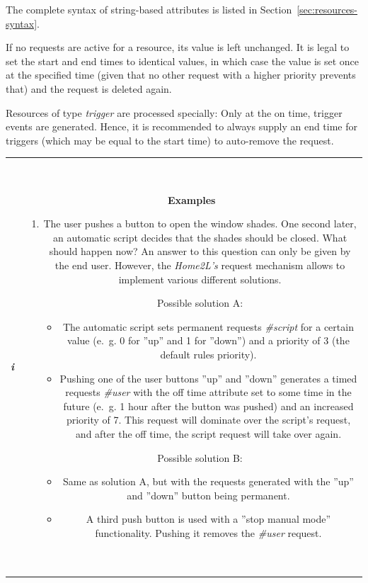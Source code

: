 \documentclass[12pt,english,parskip=half,headheight=19pt]{scrreprt}
\newcommand{\infobox}[1]{
  \par
  \medskip
  \hfill
  \setlength\arrayrulewidth{1pt}
  \begin{tabular}[t]{c|c|}
    \parbox{1.8em}{\hfill\textit{\Huge\textbf{i}\,}}
    &
    \,\parbox{0.89\linewidth}{\setlength{\parskip}{0.5em} \small #1}\,
  \end{tabular}
  \medskip
  \par
}
\begin{document}
The complete syntax of string-based attributes is listed in Section~\ref{sec:resources-syntax}.

If no requests are active for a resource, its value is left unchanged. It is legal to set the start and end times to identical values, in which case the value is set once at the specified time (given that no other request with a higher priority prevents that) and the request is deleted again.

Resources of type \textit{trigger} are processed specially: Only at the on time, trigger events are generated. Hence, it is
recommended to always supply an end time for triggers (which may be equal to the start time) to auto-remove the request.


\infobox{
  \textbf{Examples}

  \begin{enumerate}

  \item
    The user pushes a button to open the window shades. One second later,
    an automatic script decides that the shades should be closed. What should happen now?
    An answer to this question can only be given by the end user. However, the
    \textit{Home2L's} request mechanism allows to implement various different
    solutions.

    Possible solution A:
    \begin{itemize}
      \item The automatic script sets permanent requests \textit{\#script}
        for a certain value (e.~g. 0 for ''up'' and 1 for ''down'') and a priority
        of 3 (the default rules priority).
      \item Pushing one of the user buttons ''up'' and ''down'' generates a timed requests
        \textit{\#user} with the off time attribute set to some time in the future
        (e.~g. 1 hour after the button was pushed)
        and an increased priority of 7. This request will dominate over the script's
        request, and after the off time, the script request will take over again.
    \end{itemize}

    Possible solution B:
    \begin{itemize}
      \item Same as solution A, but with the requests generated with the ''up'' and
        ''down'' button being permanent.
      \item A third push button is used with a ''stop manual mode'' functionality.
        Pushing it removes the \textit{\#user} request.
    \end{itemize}


\end{enumerate}}
\end{document}
